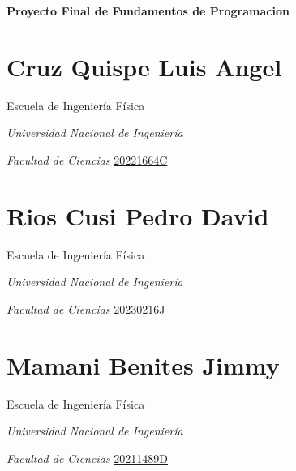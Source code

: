 \documentclass[letterpaper]{article}
\author{Luis Angel Cruz Quispe}
\date{2024-06-28}
\begin{document}
\clearpage
\pagestyle{Standard}
{\bfseries
Proyecto Final de Fundamentos de Programacio$\acute{}$n}

\begin{center}
\end{center}

\bigskip
\begin{multicols}{3}
\section{Cruz Quispe Luis Angel}
{\centering{}
Escuela de Ingeniería Física
\par}

{\centering{}
\textit{Universidad Nacional de Ingeniería}
\par}

{\centering{}
\textit{Facultad de Ciencias} \href{mailto:20221664C@uni.pe}{20221664C}
\par}

\section{Rios Cusi Pedro David}
{\centering{}
Escuela de Ingeniería Física
\par}

{\centering{}
\textit{Universidad Nacional de Ingeniería}
\par}

{\centering{}
\textit{Facultad de Ciencias} \href{mailto:20230216J@uni.pe}{20230216J}
\par}


\bigskip

\section{Mamani Benites Jimmy}
{\centering{}
Escuela de Ingeniería Física
\par}

{\centering{}
\textit{Universidad Nacional de Ingeniería}
\par}

{\centering{}
\textit{Facultad de Ciencias }\href{mailto:20211489D@uni.pe}{20211489D}
\par}
\end{multicols}
\end{document}
